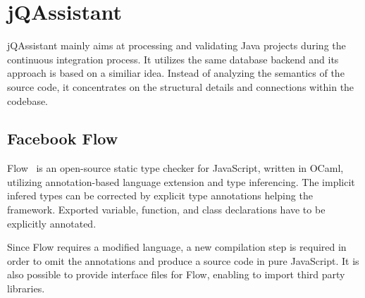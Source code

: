\section{jQAssistant}

jQAssistant mainly aims at processing and validating Java projects during the continuous integration process. It utilizes the same database backend and its approach is based on a similiar idea. Instead of analyzing the semantics of the source code, it concentrates on the structural details and connections within the codebase.


\subsection{Facebook Flow}
Flow~\cite{flow} is an open-source static type checker for JavaScript, written in OCaml, utilizing annotation-based language extension and type inferencing. The implicit infered types can be corrected by explicit type annotations helping the framework. Exported variable, function, and class declarations have to be explicitly annotated.

Since Flow requires a modified language, a new compilation step is required in order to omit the annotations and produce a source code in pure JavaScript.
It is also possible to provide interface files for Flow, enabling to import third party libraries.

